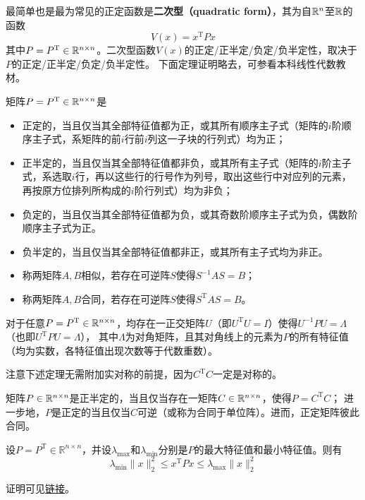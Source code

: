 最简单也是最为常见的正定函数是{\bf 二次型（quadratic form）}，其为自$\mathbb{R}{}^n$至$\mathbb{R}{}$的函数\[V(x)=x^\mathrm{T}Px\]其中$P=P^\mathrm{T}\in\mathbb{R}{}^{n\times n}$。二次型函数$V(x)$的正定/正半定/负定/负半定性，取决于$P$的正定/正半定/负定/负半定性。
下面定理证明略去，可参看本科线性代数教材。
\begin{theorem}\label{pd_nd_thm}
  矩阵$P=P^\mathrm{T}\in\mathbb{R}{}^{n\times n}$是\begin{itemize}[leftmargin=1em]
    \item 正定的，当且仅当其全部特征值都为正，或其所有顺序主子式（矩阵的$i$阶顺序主子式，系矩阵的前$i$行前$i$列这一子块的行列式）均为正；
    \item 正半定的，当且仅当其全部特征值都非负，或其所有主子式（矩阵的$i$阶主子式，系选取$i$行，再以这些行的行号作为列号，取出这些行中对应列的元素，再按原方位排列所构成的$i$阶行列式）均为非负；
    \item 负定的，当且仅当其全部特征值都为负，或其奇数阶顺序主子式为负，偶数阶顺序主子式为正。
    \item 负半定的，当且仅当其全部特征值都非正，或其所有主子式均为非正。
  \end{itemize}
\end{theorem}
\begin{definition}[相似与合同]
  \begin{itemize}[leftmargin=1em]
    \item 称两矩阵$A,B$相似，若存在可逆阵$S$使得$S^{-1}AS=B$；
    \item 称两矩阵$A,B$合同，若存在可逆阵$S$使得$S^{\mathrm{T}}AS=B$。
  \end{itemize}
\end{definition}
\begin{theorem}[实对称矩阵的正交相似对角化]\label{ortho_sim_diag}
  对于任意$P=P^\mathrm{T}\in\mathbb{R}{}^{n\times n}$，均存在一正交矩阵$U$（即$U^\mathrm{T}U=I$）使得$U^{-1}PU=\Lambda$（也即$U^{\mathrm{T}}PU=\Lambda$），
  其中$\Lambda$为对角矩阵，且其对角线上的元素为$P$的所有特征值（均为实数，各特征值出现次数等于代数重数）。
\end{theorem}
注意下述定理无需附加实对称的前提，因为$C^\mathrm{T}C$一定是对称的。
\begin{theorem}[正定、正半定矩阵的分解]\label{pd_npd_div}
  矩阵$P\in\mathbb{R}{}^{n\times n}$是正半定的，当且仅当存在一矩阵$C\in\mathbb{R}{}^{n\times n}$，使得$P=C^\mathrm{T}C$；
  进一步地，$P$是正定的当且仅当$C$可逆（或称为合同于单位阵）。进而，正定矩阵彼此合同。
\end{theorem}
\begin{theorem}\label{rayleigh-ritz}
  设$P=P^{\mathrm{T}}\in\mathbb{R}^{n\times n}$，并设$\lambda_\mathrm{max}$和$\lambda_\mathrm{min}$分别是$P$的最大特征值和最小特征值。则有
\[\lambda_{\mathrm{min}}\|x\|_{2}^{2}\le x^{\mathrm{T}}Px\le \lambda_{\mathrm{max}}\|x\|_{2}^{2}\]
\end{theorem}
证明可见\href{https://oliverwu.top/file/rayleigh-ritz.pdf}{链接}。
